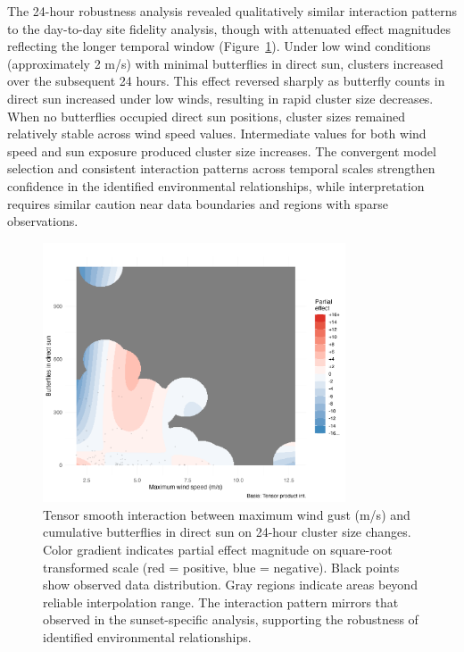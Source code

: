 The 24-hour robustness analysis revealed qualitatively similar interaction patterns to the day-to-day site fidelity analysis, though with attenuated effect magnitudes reflecting the longer temporal window (Figure~\ref{fig:interaction_wind_sun_24hr}). Under low wind conditions (approximately 2 m/s) with minimal butterflies in direct sun, clusters increased over the subsequent 24 hours. This effect reversed sharply as butterfly counts in direct sun increased under low winds, resulting in rapid cluster size decreases. When no butterflies occupied direct sun positions, cluster sizes remained relatively stable across wind speed values. Intermediate values for both wind speed and sun exposure produced cluster size increases. The convergent model selection and consistent interaction patterns across temporal scales strengthen confidence in the identified environmental relationships, while interpretation requires similar caution near data boundaries and regions with sparse observations.

\begin{figure}[htbp]
    \centering
    \includegraphics[width=0.8\textwidth]{supplemental/results/24hr/figures/interaction_wind_x_sun_binned.png}
    \caption[Wind × sunlight interaction (24-hour robustness)]{Tensor smooth interaction between maximum wind gust (m/s) and cumulative butterflies in direct sun on 24-hour cluster size changes. Color gradient indicates partial effect magnitude on square-root transformed scale (red = positive, blue = negative). Black points show observed data distribution. Gray regions indicate areas beyond reliable interpolation range. The interaction pattern mirrors that observed in the sunset-specific analysis, supporting the robustness of identified environmental relationships.}
    \label{fig:interaction_wind_sun_24hr}
\end{figure}
